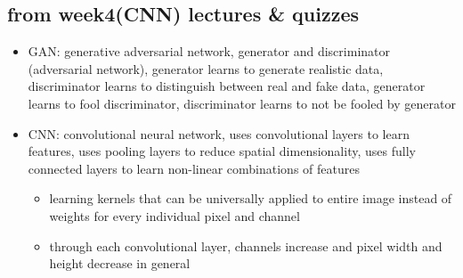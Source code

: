 \documentclass[10pt]{article}
\begin{document}
\subsection*{from week4(CNN) lectures \& quizzes}
\begin{itemize}[label=\(\star\), leftmargin=1em, itemsep=-0.3em]
    \item GAN: generative adversarial network, generator and discriminator (adversarial network), generator learns to generate realistic data, discriminator learns to distinguish between real and fake data, generator learns to fool discriminator, discriminator learns to not be fooled by generator
    \item CNN: convolutional neural network, uses convolutional layers to learn features, uses pooling layers to reduce spatial dimensionality, uses fully connected layers to learn non-linear combinations of features
    \begin{itemize}[label=\(\star\), leftmargin=1em, itemsep=-0.3em]
        \item learning kernels that can be universally applied to entire image instead of weights for every individual pixel and channel
        \item through each convolutional layer, channels increase and pixel width and height decrease in general


\end{itemize}
\end{itemize}
\end{document}
